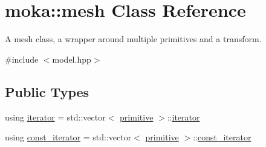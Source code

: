 \hypertarget{classmoka_1_1mesh}{}\section{moka\+::mesh Class Reference}
\label{classmoka_1_1mesh}


A mesh class, a wrapper around multiple primitives and a transform.  




{\ttfamily \#include $<$model.\+hpp$>$}

\subsection*{Public Types}
\begin{DoxyCompactItemize}
\item 
using \mbox{\hyperlink{classmoka_1_1mesh_a89827e48d6ebf6481c9a923042324756}{iterator}} = std\+::vector$<$ \mbox{\hyperlink{classmoka_1_1primitive}{primitive}} $>$\+::\mbox{\hyperlink{classmoka_1_1mesh_a89827e48d6ebf6481c9a923042324756}{iterator}}
\item 
using \mbox{\hyperlink{classmoka_1_1mesh_aea68be7cc8e79b9825775f199562bf90}{const\+\_\+iterator}} = std\+::vector$<$ \mbox{\hyperlink{classmoka_1_1primitive}{primitive}} $>$\+::\mbox{\hyperlink{classmoka_1_1mesh_aea68be7cc8e79b9825775f199562bf90}{const\+\_\+iterator}}
\end{DoxyCompactItemize}
